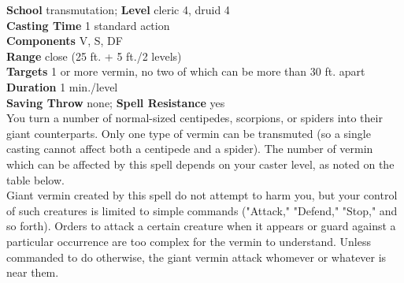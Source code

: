 \textbf{School} transmutation; \textbf{Level} cleric 4, druid 4\\
\textbf{Casting Time} 1 standard action\\
\textbf{Components} V, S, DF\\
\textbf{Range} close (25 ft. + 5 ft./2 levels)\\
\textbf{Targets} 1 or more vermin, no two of which can be more than 30 ft. apart\\
\textbf{Duration} 1 min./level\\
\textbf{Saving Throw} none; \textbf{Spell Resistance} yes\\
You turn a number of normal-sized centipedes, scorpions, or spiders into their giant counterparts. Only one type of vermin can be transmuted (so a single casting cannot affect both a centipede and a spider). The number of vermin which can be affected by this spell depends on your caster level, as noted on the table below.\\
Giant vermin created by this spell do not attempt to harm you, but your control of such creatures is limited to simple commands ("Attack," "Defend," "Stop," and so forth). Orders to attack a certain creature when it appears or guard against a particular occurrence are too complex for the vermin to understand. Unless commanded to do otherwise, the giant vermin attack whomever or whatever is near them.\\
